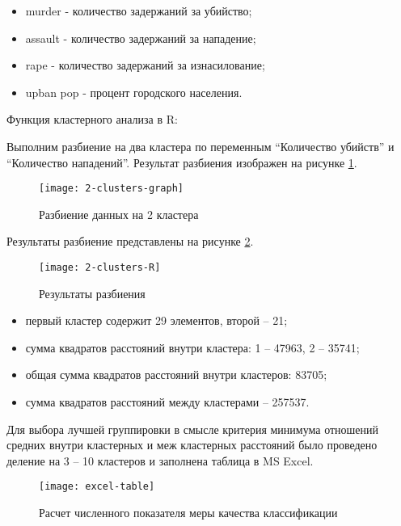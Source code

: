 \documentclass[a4paper,14pt]{extarticle}
\begin{document}
\begin{itemize}
    \item murder - количество задержаний за убийство;
    \item assault - количество задержаний за нападение;
    \item rape - количество задержаний за изнасилование;
    \item upban pop - процент городского населения.
\end{itemize}

Функция кластерного анализа в R:


Выполним разбиение на два кластера по переменным \enquote{Количество убийств} и
\enquote{Количество нападений}. Результат разбиения изображен на рисунке
\ref{fig:2-clusters-graph}.

\begin{figure}[H]
    \centering
    \texttt{[image: 2-clusters-graph]}
    \caption{Разбиение данных на 2 кластера}
    \label{fig:2-clusters-graph}
\end{figure}

Результаты разбиение представлены на рисунке \ref{fig:2-clusters-R}.

\begin{figure}[H]
    \centering
    \texttt{[image: 2-clusters-R]}
    \caption{Результаты разбиения}
    \label{fig:2-clusters-R}
\end{figure}

\begin{itemize}
    \item первый кластер содержит 29 элементов, второй – 21;
    \item сумма квадратов расстояний внутри кластера: 1 – 47963, 2 – 35741;
    \item общая сумма квадратов расстояний внутри кластеров: 83705;
    \item сумма квадратов расстояний между кластерами – 257537.
\end{itemize}

Для выбора лучшей группировки в смысле критерия минимума отношений средних
внутри кластерных и меж кластерных расстояний было проведено деление на 3 – 10
кластеров и заполнена таблица в MS Excel.

\begin{figure}[H]
    \centering
    \texttt{[image: excel-table]}
    \caption{Расчет численного показателя меры качества классификации}
    \label{fig:excel-table}
\end{figure}
\end{document}
